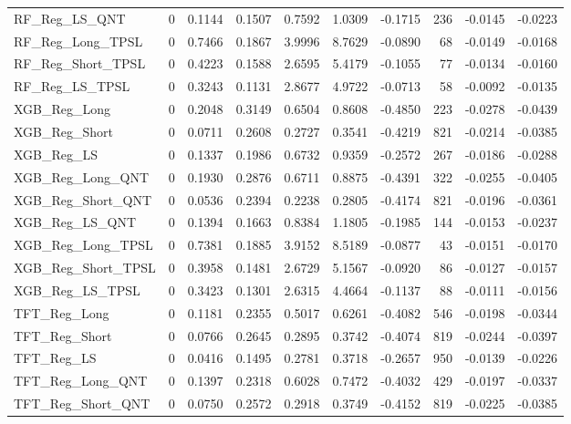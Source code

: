 \begin{tabular}{llrrrrrrrr}
\cline{1-10}
RF\_Reg\_LS\_QNT & 0 & 0.1144 & 0.1507 & 0.7592 & 1.0309 & -0.1715 & 236 & -0.0145 & -0.0223 \\
\cline{1-10}
RF\_Reg\_Long\_TPSL & 0 & 0.7466 & 0.1867 & 3.9996 & 8.7629 & -0.0890 & 68 & -0.0149 & -0.0168 \\
\cline{1-10}
RF\_Reg\_Short\_TPSL & 0 & 0.4223 & 0.1588 & 2.6595 & 5.4179 & -0.1055 & 77 & -0.0134 & -0.0160 \\
\cline{1-10}
RF\_Reg\_LS\_TPSL & 0 & 0.3243 & 0.1131 & 2.8677 & 4.9722 & -0.0713 & 58 & -0.0092 & -0.0135 \\
\cline{1-10}
XGB\_Reg\_Long & 0 & 0.2048 & 0.3149 & 0.6504 & 0.8608 & -0.4850 & 223 & -0.0278 & -0.0439 \\
\cline{1-10}
XGB\_Reg\_Short & 0 & 0.0711 & 0.2608 & 0.2727 & 0.3541 & -0.4219 & 821 & -0.0214 & -0.0385 \\
\cline{1-10}
XGB\_Reg\_LS & 0 & 0.1337 & 0.1986 & 0.6732 & 0.9359 & -0.2572 & 267 & -0.0186 & -0.0288 \\
\cline{1-10}
XGB\_Reg\_Long\_QNT & 0 & 0.1930 & 0.2876 & 0.6711 & 0.8875 & -0.4391 & 322 & -0.0255 & -0.0405 \\
\cline{1-10}
XGB\_Reg\_Short\_QNT & 0 & 0.0536 & 0.2394 & 0.2238 & 0.2805 & -0.4174 & 821 & -0.0196 & -0.0361 \\
\cline{1-10}
XGB\_Reg\_LS\_QNT & 0 & 0.1394 & 0.1663 & 0.8384 & 1.1805 & -0.1985 & 144 & -0.0153 & -0.0237 \\
\cline{1-10}
XGB\_Reg\_Long\_TPSL & 0 & 0.7381 & 0.1885 & 3.9152 & 8.5189 & -0.0877 & 43 & -0.0151 & -0.0170 \\
\cline{1-10}
XGB\_Reg\_Short\_TPSL & 0 & 0.3958 & 0.1481 & 2.6729 & 5.1567 & -0.0920 & 86 & -0.0127 & -0.0157 \\
\cline{1-10}
XGB\_Reg\_LS\_TPSL & 0 & 0.3423 & 0.1301 & 2.6315 & 4.4664 & -0.1137 & 88 & -0.0111 & -0.0156 \\
\cline{1-10}
TFT\_Reg\_Long & 0 & 0.1181 & 0.2355 & 0.5017 & 0.6261 & -0.4082 & 546 & -0.0198 & -0.0344 \\
\cline{1-10}
TFT\_Reg\_Short & 0 & 0.0766 & 0.2645 & 0.2895 & 0.3742 & -0.4074 & 819 & -0.0244 & -0.0397 \\
\cline{1-10}
TFT\_Reg\_LS & 0 & 0.0416 & 0.1495 & 0.2781 & 0.3718 & -0.2657 & 950 & -0.0139 & -0.0226 \\
\cline{1-10}
TFT\_Reg\_Long\_QNT & 0 & 0.1397 & 0.2318 & 0.6028 & 0.7472 & -0.4032 & 429 & -0.0197 & -0.0337 \\
\cline{1-10}
TFT\_Reg\_Short\_QNT & 0 & 0.0750 & 0.2572 & 0.2918 & 0.3749 & -0.4152 & 819 & -0.0225 & -0.0385 \\

\end{tabular}

